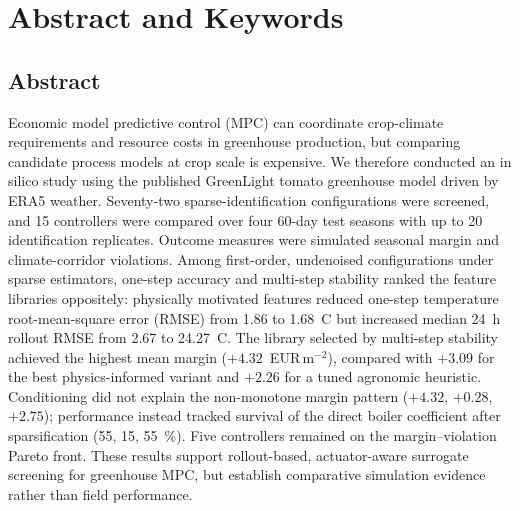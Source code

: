 \section{Abstract and Keywords}
\label{sec:abstract}


\subsection{Abstract}

Economic model predictive control (MPC) can coordinate crop-climate requirements
and resource costs in greenhouse production, but comparing candidate process
models at crop scale is expensive. We therefore conducted an in silico study using
the published GreenLight tomato greenhouse model driven by ERA5 weather. Seventy-two
sparse-identification configurations were screened, and 15 controllers were
compared over four 60-day test seasons with up to 20 identification replicates.
Outcome measures were simulated seasonal margin and climate-corridor violations. Among
first-order, undenoised configurations under sparse estimators, one-step accuracy and
multi-step stability ranked the feature libraries oppositely:
physically motivated features reduced one-step temperature root-mean-square error
(RMSE) from 1.86 to
1.68~\textdegree C but increased median 24~h rollout RMSE from 2.67 to
24.27~\textdegree C. The library selected by multi-step stability achieved the
highest mean margin ($+4.32$~EUR\,m$^{-2}$), compared with $+3.09$ for the best
physics-informed variant and $+2.26$ for a tuned agronomic heuristic. Conditioning
did not explain the non-monotone margin pattern ($+4.32$, $+0.28$, $+2.75$);
performance instead tracked survival of the direct boiler coefficient after
sparsification (55, 15, 55~\%). Five controllers remained on the margin--violation
Pareto front. These results support rollout-based, actuator-aware surrogate
screening for greenhouse MPC, but establish comparative simulation evidence rather
than field performance.

